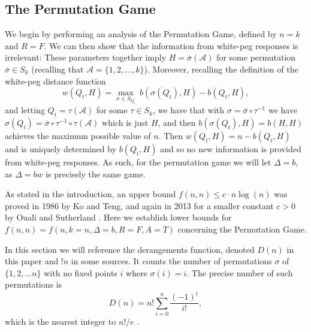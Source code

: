 \documentclass[12pt, a4paper]{article}
\newcommand{\inv}{^{-1}}              %
\begin{document}
\subsection{The Permutation Game}
We begin by performing an analysis of the Permutation Game, defined by $n=k$ and $R=F$. We can then show that the information from white-peg responses is irrelevant: These parameters together imply $H=\overline{\sigma}(\mathcal{A})$ for some permutation $\overline{\sigma}\in S_k$ (recalling that $\mathcal{A}=\{1,2,\ldots, k\}$). Moreover, recalling the definition of the white-peg distance function
\begin{equation*}
	w(Q_t, H) = \max_{\sigma\in S_{Q_t}}~b(\sigma(Q_t), H) - b(Q_t, H),
\end{equation*}
and letting $Q_t = \tau(\mathcal{A})$ for some $\tau \in S_k$, we have that with $\sigma = \overline{\sigma}\circ \tau\inv$ we have $\sigma(Q_t) = \overline{\sigma}\circ\tau\inv\circ\tau(\mathcal A)$ which is just $H$, and then $b(\sigma(Q_t),H) = b(H,H)$ achieves the maximum possible value of $n$. Then $w(Q_t,H) = n - b(Q_t,H)$ and is uniquely determined by $b(Q_t,H)$ and so no new information is provided from white-peg responses. As such, for the permutation game we will let $\Delta = b$, as $\Delta = bw$ is precisely the same game.

 As stated in the introduction, an upper bound $f(n, n)\le c\cdot n\log(n)$ was proved in 1986 by Ko and Teng, and again in 2013 for a smaller constant $c>0$ by Ouali and Sutherland \cite{KT86, OS13}. Here we establish lower bounds for $f(n, n) = f(n, k=n, \Delta=b, R=F, A=T)$ concerning the Permutation Game.
 
 In this section we will reference the derangements function, denoted $D(n)$ in this paper and $!n$ in some sources. It counts the number of permutations $\sigma$ of $\{1,2,\ldots n\}$ with no fixed points $i$ where $\sigma(i) = i$. The precise number of such permutations is
 \begin{equation}\label{derangements}
 D(n) = n!\sum_{i=0}^n \frac{(-1)^i}{i!},
 \end{equation}
which is the nearest integer to $n!/e$  \cite{MH03}. 
\end{document}
